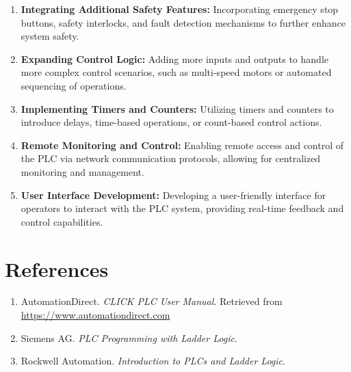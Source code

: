 \documentclass[12pt]{article}
\begin{document}
\begin{enumerate}
    \item \textbf{Integrating Additional Safety Features:} Incorporating emergency stop buttons, safety interlocks, and fault detection mechanisms to further enhance system safety.
    
    \item \textbf{Expanding Control Logic:} Adding more inputs and outputs to handle more complex control scenarios, such as multi-speed motors or automated sequencing of operations.
    
    \item \textbf{Implementing Timers and Counters:} Utilizing timers and counters to introduce delays, time-based operations, or count-based control actions.
    
    \item \textbf{Remote Monitoring and Control:} Enabling remote access and control of the PLC via network communication protocols, allowing for centralized monitoring and management.
    
    \item \textbf{User Interface Development:} Developing a user-friendly interface for operators to interact with the PLC system, providing real-time feedback and control capabilities.
\end{enumerate}

\section*{References}

\begin{enumerate}
    \item AutomationDirect. \textit{CLICK PLC User Manual}. Retrieved from \url{https://www.automationdirect.com}
    \item Siemens AG. \textit{PLC Programming with Ladder Logic}.
    \item Rockwell Automation. \textit{Introduction to PLCs and Ladder Logic}.
\end{enumerate}
\end{document}
